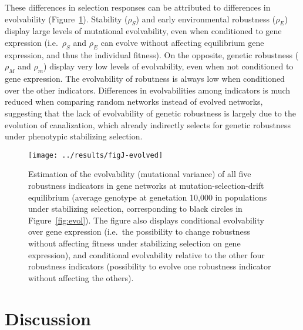 \documentclass[10pt,a4paper]{article}
\newcommand{\stability}{{\rho_S}}
\newcommand{\earlyenv}{{\rho_E}}
\newcommand{\earlymut}{{\rho_M}}
\newcommand{\latemut}{{\rho_m}}
\begin{document}
These differences in selection responses can be attributed to differences in evolvability (Figure~\ref{fig:evolvability}). Stability ($\stability$) and early environmental robustness ($\earlyenv$) display large levels of mutational evolvability, even when conditioned to gene expression (i.e.\, $\stability$ and $\earlyenv$ can evolve without affecting equilibrium gene expression, and thus the individual fitness). On the opposite, genetic robustness ($\earlymut$ and $\latemut$) display very low levels of evolvability, even when not conditioned to gene expression. The evolvability of robutness is always low when conditioned over the other indicators. Differences in evolvabilities among indicators is much reduced when comparing random networks instead of evolved networks, suggesting that the lack of evolvability of genetic robustness is largely due to the evolution of canalization, which already indirectly selects for genetic robustness under phenotypic stabilizing selection. 

\begin{figure}[t]
\begin{center}
\texttt{[image: ../results/figJ-evolved]}
\caption{\color{Gray} \label{fig:evolvability} Estimation of the evolvability (mutational variance) of all five robustness indicators in gene networks at mutation-selection-drift equilibrium (average genotype at genetation 10,000 in populations under stabilizing selection, corresponding to black circles in Figure~\ref{fig:evol}). The figure also displays conditional evolvability over gene expression (i.e.\ the possibility to change robustness without affecting fitness under stabilizing selection on gene expression), and conditional evolvability relative to the other four robustness indicators (possibility to evolve one robustness indicator without affecting the others). }
\end{center}
\end{figure}


\section{Discussion}
\end{document}
